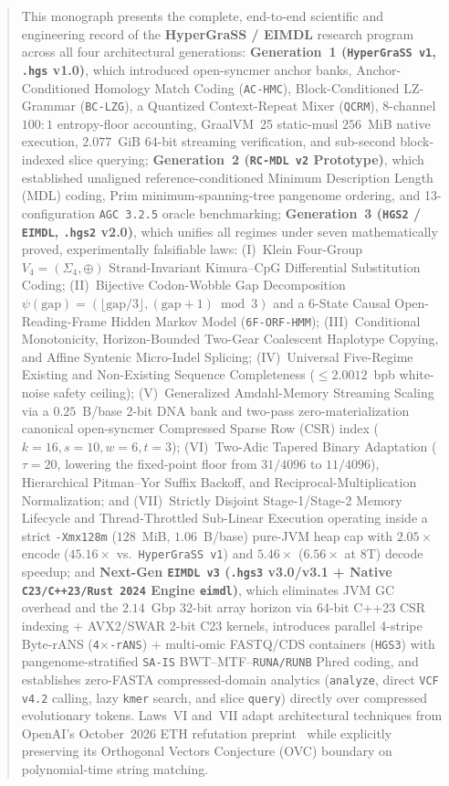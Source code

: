 \documentclass[10pt]{article}
\theoremstyle{definition}
\begin{document}
\begin{abstract}
This monograph presents the complete, end-to-end scientific and engineering record of the \textbf{HyperGraSS / EIMDL} research program across all four architectural generations:
\textbf{Generation~1 (\texttt{HyperGraSS v1}, \texttt{.hgs} v1.0)}, which introduced open-syncmer anchor banks, Anchor-Conditioned Homology Match Coding (\texttt{AC-HMC}), Block-Conditioned LZ-Grammar (\texttt{BC-LZG}), a Quantized Context-Repeat Mixer (\texttt{QCRM}), 8-channel $100:1$ entropy-floor accounting, GraalVM~25 static-musl $256$~MiB native execution, $2.077$~GiB 64-bit streaming verification, and sub-second block-indexed slice querying;
\textbf{Generation~2 (\texttt{RC-MDL v2} Prototype)}, which established unaligned reference-conditioned Minimum Description Length (MDL) coding, Prim minimum-spanning-tree pangenome ordering, and 13-configuration \texttt{AGC~3.2.5} oracle benchmarking;
\textbf{Generation~3 (\texttt{HGS2} / \texttt{EIMDL}, \texttt{.hgs2} v2.0)}, which unifies all regimes under seven mathematically proved, experimentally falsifiable laws:
(I)~Klein Four-Group $V_4 = (\Sigma_4,\oplus)$ Strand-Invariant Kimura--CpG Differential Substitution Coding;
(II)~Bijective Codon-Wobble Gap Decomposition $\psi(\text{gap})=(\lfloor\text{gap}/3\rfloor, (\text{gap}+1)\bmod 3)$ and a 6-State Causal Open-Reading-Frame Hidden Markov Model (\texttt{6F-ORF-HMM});
(III)~Conditional Monotonicity, Horizon-Bounded Two-Gear Coalescent Haplotype Copying, and Affine Syntenic Micro-Indel Splicing;
(IV)~Universal Five-Regime Existing and Non-Existing Sequence Completeness ($\le 2.0012$~bpb white-noise safety ceiling);
(V)~Generalized Amdahl-Memory Streaming Scaling via a $0.25$~B/base 2-bit DNA bank and two-pass zero-materialization canonical open-syncmer Compressed Sparse Row (CSR) index ($k=16, s=10, w=6, t=3$);
(VI)~Two-Adic Tapered Binary Adaptation ($\tau=20$, lowering the fixed-point floor from $31/4096$ to $11/4096$), Hierarchical Pitman--Yor Suffix Backoff, and Reciprocal-Multiplication Normalization; and
(VII)~Strictly Disjoint Stage-1/Stage-2 Memory Lifecycle and Thread-Throttled Sub-Linear Execution operating inside a strict \texttt{-Xmx128m} ($128$~MiB, $1.06$~B/base) pure-JVM heap cap with $2.05\times$ encode ($45.16\times$ vs.\ \texttt{HyperGraSS~v1}) and $5.46\times$ ($6.56\times$ at 8T) decode speedup; and
\textbf{Next-Gen \texttt{EIMDL v3} (\texttt{.hgs3} v3.0/v3.1 + Native \texttt{C23/C++23/Rust~2024} Engine \texttt{eimdl})}, which eliminates JVM GC overhead and the $2.14$~Gbp 32-bit array horizon via 64-bit C++23 CSR indexing + AVX2/SWAR 2-bit C23 kernels, introduces parallel 4-stripe Byte-rANS (\texttt{4$\times$-rANS}) + multi-omic FASTQ/CDS containers (\texttt{HGS3}) with pangenome-stratified \texttt{SA-IS} BWT--MTF--\texttt{RUNA/RUNB} Phred coding, and establishes zero-FASTA compressed-domain analytics (\texttt{analyze}, direct \texttt{VCF v4.2} calling, lazy \texttt{kmer} search, and slice \texttt{query}) directly over compressed evolutionary tokens.
Laws~VI and~VII adapt architectural techniques from OpenAI's October~2026 ETH refutation preprint~\cite{openai2026eth} while explicitly preserving its Orthogonal Vectors Conjecture (OVC) boundary on polynomial-time string matching.


\end{abstract}
\end{document}
